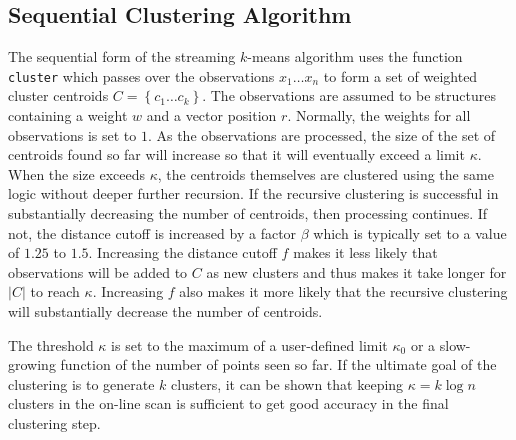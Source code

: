 \documentclass[11pt]{amsart}
\begin{document}
\subsection{Sequential Clustering Algorithm}
The sequential form of the streaming $k$-means algorithm uses the function {\tt cluster} which passes over the observations $x_1 \ldots x_n$  to form a set of weighted cluster centroids $C = \left\lbrace c_1 \ldots c_k\right\rbrace$.  The observations are assumed to be structures containing a weight $w$ and a vector position $r$.  Normally, the weights for all observations is set to $1$.  As the observations are processed, the size of the set of centroids found so far will increase so that it will eventually exceed a limit $\kappa$.  When the size exceeds $\kappa$, the centroids themselves are clustered using the same logic without deeper further recursion.  If the recursive clustering is successful in substantially decreasing the number of centroids, then processing continues.  If not, the distance cutoff is increased by a factor $\beta$ which is typically set to a value of $1.25$ to $1.5$.  Increasing the distance cutoff $f$ makes it less likely that observations will be added to $C$ as new clusters and thus makes it take longer for $|C|$ to reach $\kappa$.  Increasing $f$ also makes it more likely that the recursive clustering will substantially decrease the number of centroids.  

The threshold $\kappa$ is set to the maximum of a user-defined limit $\kappa_0$ or a slow-growing function of the number of points seen so far.  If the ultimate goal of the clustering is to generate $k$ clusters, it can be shown that keeping $\kappa = k \log n$ clusters in the on-line scan is sufficient to get good accuracy in the final clustering step.
\end{document}
